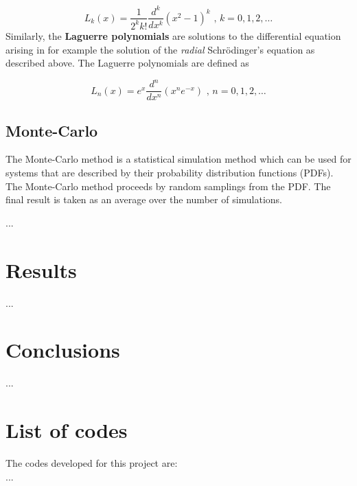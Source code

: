 \documentclass{article}
\begin{document}
\begin{multicols}{2}
\begin{equation}
	L_k(x) = \frac{1}{2^k k!} \frac{d^k}{dx^k} (x^2 - 1)^k \textrm{ , } k = 0,1,2, \dots
\end{equation}
Similarly, the \textbf{Laguerre polynomials} are solutions to the differential equation arising in for example the solution of the \textit{radial} Schr\"{o}dinger's equation as described above. The Laguerre polynomials are defined as

\begin{equation}
	L_n(x) = e^x \frac{d^n}{dx^n} (x^n e^{-x}) \textrm{ , } n = 0,1,2, \dots
\end{equation}


\subsection{Monte-Carlo}
The Monte-Carlo method is a statistical simulation method which can be used for systems that are described by their probability distribution functions (PDFs). The Monte-Carlo method proceeds by random samplings from the PDF. The final result is taken as an average over the number of simulations.

... 


\section{Results}
...



\section{Conclusions}
...





\section{List of codes}

The codes developed for this project are:\\
...

\end{multicols}
\end{document}
